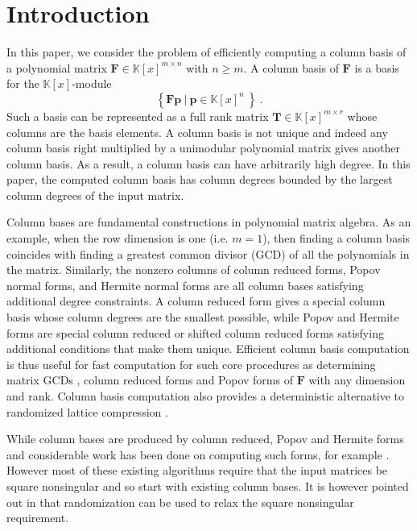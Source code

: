 
\section{\label{sec:Matrix-GCD}Introduction}

In this paper, we consider the problem of efficiently computing a
column basis of a polynomial matrix $\mathbf{F}\in\mathbb{K}\left[x\right]^{m\times n}$
with $n\ge m$. A column basis of $\mathbf{F}$ is a basis for the
$\mathbb{K}\left[x\right]$-module 
\[
\left\{ \mathbf{F}\mathbf{p}~|~\mathbf{p}\in\mathbb{K}\left[x\right]^{n}~\right\} ~.
\]
Such a basis can be represented as a full rank matrix 
$\mathbf{T}\in\mathbb{K}\left[x\right]^{m\times r}$
whose columns are the basis elements. A column basis is not
unique and indeed any column basis right multiplied by a unimodular
polynomial matrix gives another column basis. As a result, a column basis can
have arbitrarily high degree. In this paper, the computed column basis 
has column degrees bounded by the largest column degrees of the input
matrix.

Column bases are fundamental constructions in polynomial matrix algebra.
As an example, when the row dimension is one (i.e. $m=1$), then finding a column basis
coincides with finding a greatest common divisor (GCD) of all the
polynomials in the matrix. Similarly, the nonzero columns of column
reduced forms, Popov normal forms, and Hermite normal forms are all
column bases satisfying additional degree constraints. A column reduced
form gives a special column basis whose column degrees are the smallest
possible, while Popov and Hermite forms are special column reduced
or shifted column reduced forms satisfying additional conditions that
make them unique. Efficient column basis computation is thus useful
for fast computation for such core procedures as determining matrix
GCDs \cite{BL2000}, column reduced forms \cite{BVP:1988} and Popov
forms \cite{villard96} of $\mathbf{F}$ with any dimension and rank.
Column basis computation %
also provides a deterministic
alternative to randomized lattice compression \cite{li:2006,storjohann-villard:2005}.

While column bases are produced by column reduced, Popov and Hermite forms and considerable
work has been done on computing such forms, for example
\cite{bcl:2006,beelen:1988,Giorgi2003,GSSV2012,sarkar2011,SS2011}. However
most of these existing algorithms require that the  input matrices be square 
nonsingular and so start with existing column bases. It is however pointed
out in \cite{sarkar2011,SS2011} that randomization can be used to
relax the square nonsingular requirement.

